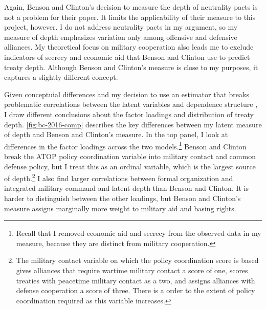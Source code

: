 \documentclass[12pt]{article}
\begin{document}
Again, Benson and Clinton's decision to measure the depth of neutrality pacts is not a problem for their paper. 
It limits the applicability of their measure to this project, however. 
I do not address neutrality pacts in my argument, so my measure of depth emphasizes variation only among offensive and defensive alliances. 
My theoretical focus on military cooperation also leads me to exclude indicators of secrecy and economic aid that Benson and Clinton use to predict treaty depth. 
Although Benson and Clinton's measure is close to my purposes, it captures a slightly different concept. 


Given conceptuial differences and my decision to use an estimator that breaks problematic correlations between the latent variables and dependence structure \citep{Murrayetal2013}, I draw different conclusions about the factor loadings and distribution of treaty depth. 
\autoref{fig:bc-2016-comp} describes the key differences between my latent measure of depth and Benson and Clinton's measure.
In the top panel, I look at differences in the factor loadings across the two models.\footnote{Recall that I removed economic aid and secrecy from the observed data in my measure, because they are distinct from military cooperation.} 
Benson and Clinton break the ATOP policy coordination variable into military contact and common defense policy, but I treat this as an ordinal variable, which is the largest source of depth.\footnote{The military contact variable on which the policy coordination score is based gives alliances that require wartime military contact a score of one, scores treaties with peacetime military contact as a two, and assigns alliances with defense cooperation a score of three. There is a order to the extent of policy coordination required as this variable increases.}
I also find larger correlations between formal organization and integrated military command and latent depth than Benson and Clinton.
It is harder to distinguish between the other loadings, but Benson and Clinton's measure assigns marginally more weight to military aid and basing rights.  
\end{document}
